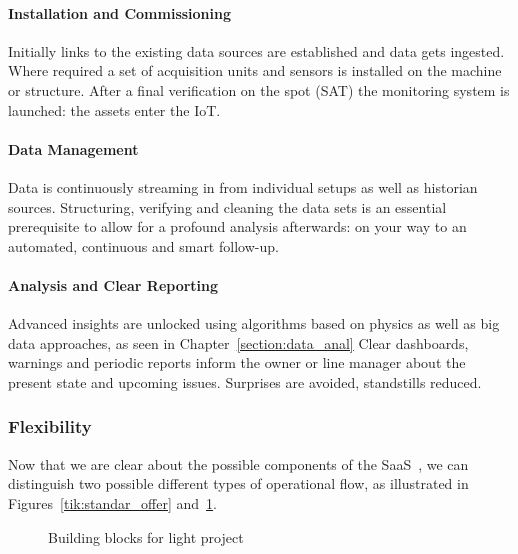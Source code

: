 \paragraph{Installation and Commissioning}
Initially links to the existing data sources are established and data gets ingested.
Where required a set of acquisition units and sensors is installed on the machine or structure.
After a final verification on the spot (SAT) the monitoring system is launched: the assets enter the \acl{IoT}.

\paragraph{Data Management}
Data is continuously streaming in from individual setups as well as historian sources.
Structuring, verifying and cleaning the data sets is an essential prerequisite to allow for a profound analysis afterwards: on your way to an automated, continuous and smart follow-up.

\paragraph{Analysis and Clear Reporting}
Advanced insights are unlocked using algorithms based on physics as well as big data approaches, as seen in Chapter~\ref{section:data_anal}
Clear dashboards, warnings and periodic reports inform the owner or line manager about the present state and upcoming issues. Surprises are avoided, standstills reduced.

\subsubsection{Flexibility}
Now that we are clear about the possible components of the \ac{SaaS}~\cite{Article:matthewlemerle_2012_its}, we can distinguish two possible different types of operational flow, as illustrated in Figures~\ref{tik:standar_offer} and~\ref{tik:ligth_offer}.
\begin{figure}[ht]
	\centering
	\caption{Building blocks for light project}
	\label{tik:ligth_offer}
\end{figure}

